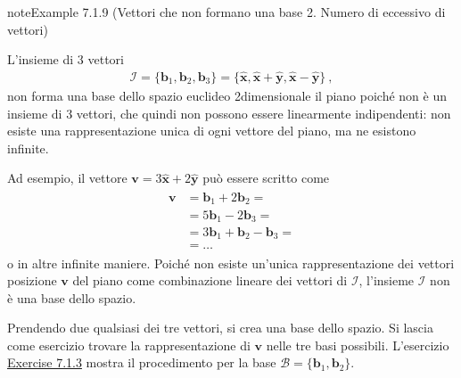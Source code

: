 \documentclass[letterpaper,10pt,italian]{jupyterBook}
\begin{document}
\begin{sphinxadmonition}{note}{Example 7.1.9 (Vettori che non formano una base \sphinxhyphen{} 2. Numero di eccessivo di vettori)}



\sphinxAtStartPar
L’insieme di 3 vettori
\begin{equation*}
\begin{split}\mathcal{I} = \{ \mathbf{b}_1, \mathbf{b}_2, \mathbf{b}_3 \} = \{ \hat{\mathbf{x}}, \hat{\mathbf{x}} + \hat{\mathbf{y}}, \hat{\mathbf{x}} - \hat{\mathbf{y}} \} \ , \end{split}
\end{equation*}
\sphinxAtStartPar
non forma una base dello spazio euclideo 2\sphinxhyphen{}dimensionale \sphinxhyphen{} il piano \sphinxhyphen{} poiché non è un insieme di 3 vettori, che quindi non possono essere linearmente indipendenti: non esiste una rappresentazione unica di ogni vettore del piano, ma ne esistono infinite.

\sphinxAtStartPar
Ad esempio, il vettore \(\mathbf{v} = 3 \hat{\mathbf{x}} + 2 \hat{\mathbf{y}}\) può essere scritto come
\begin{equation*}
\begin{split}\begin{aligned}
  \mathbf{v} 
  & = \mathbf{b}_1 + 2 \mathbf{b}_2 = \\
  & = 5 \mathbf{b}_1 - 2 \mathbf{b}_3 = \\
  & = 3 \mathbf{b}_1 + \mathbf{b}_2 - \mathbf{b}_3 = \\
  & = \dots
\end{aligned}\end{split}
\end{equation*}
\sphinxAtStartPar
o in altre infinite maniere. Poiché non esiste un’unica rappresentazione dei vettori posizione \(\mathbf{v}\) del piano come combinazione lineare dei vettori di \(\mathcal{I}\), l’insieme \(\mathcal{I}\) non è una base dello spazio.

\sphinxAtStartPar
Prendendo due qualsiasi dei tre vettori, si crea una base dello spazio. Si lascia come esercizio trovare la rappresentazione di \(\mathbf{v}\) nelle tre basi possibili. L’esercizio \hyperref[exercise:ex-vectors-euclidean-1]{Exercise 7.1.3} mostra il procedimento per la base \(\mathcal{B} = \{ \mathbf{b}_1, \mathbf{b}_2 \}\).
\end{sphinxadmonition}
 \label{exercise:ex-vectors-euclidean}
\end{document}
